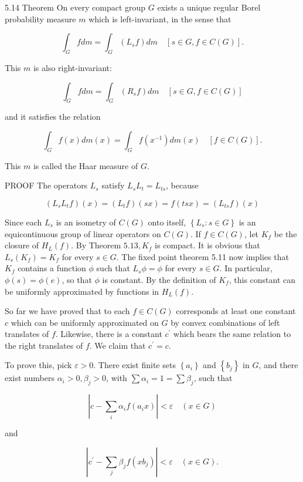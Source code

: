 \documentclass[10pt]{article}
\begin{document}
5.14 Theorem On every compact group $G$ exists a unique regular Borel probability measure $m$ which is left-invariant, in the sense that

$$
\int_{G} f d m=\int_{G}\left(L_{s} f\right) d m \quad[s \in G, f \in C(G)] .
$$

This $m$ is also right-invariant:

$$
\int_{G} f d m=\int_{G}\left(R_{s} f\right) d m \quad[s \in G, f \in C(G)]
$$

and it satisfies the relation

$$
\int_{G} f(x) d m(x)=\int_{G} f\left(x^{-1}\right) d m(x) \quad[f \in C(G)] .
$$

This $m$ is called the Haar measure of $G$.

PROOF The operators $L_{s}$ satisfy $L_{s} L_{t}=L_{t s}$, because

$$
\left(L_{s} L_{t} f\right)(x)=\left(L_{t} f\right)(s x)=f(t s x)=\left(L_{t s} f\right)(x)
$$

Since each $L_{s}$ is an isometry of $C(G)$ onto itself, $\left\{L_{s}: s \in G\right\}$ is an equicontinuous group of linear operators on $C(G)$. If $f \in C(G)$, let $K_{f}$ be the closure of $H_{L}(f)$. By Theorem $5.13, K_{f}$ is compact. It is obvious that $L_{s}\left(K_{f}\right)=K_{f}$ for every $s \in G$. The fixed point theorem 5.11 now implies that $K_{f}$ contains a function $\phi$ such that $L_{s} \phi=\phi$ for every $s \in G$. In particular, $\phi(s)=\phi(e)$, so that $\phi$ is constant. By the definition of $K_{f}$, this constant can be uniformly approximated by functions in $H_{L}(f)$.

So far we have proved that to each $f \in C(G)$ corresponds at least one constant $c$ which can be uniformly approximated on $G$ by convex combinations of left translates of $f$. Likewise, there is a constant $c^{\prime}$ which bears the same relation to the right translates of $f$. We claim that $c^{\prime}=c$.

To prove this, pick $\varepsilon>0$. There exist finite sets $\left\{a_{i}\right\}$ and $\left\{b_{j}\right\}$ in $G$, and there exist numbers $\alpha_{i}>0, \beta_{j}>0$, with $\sum \alpha_{i}=1=\sum \beta_{j}$, such that

$$
\left|c-\sum_{i} \alpha_{i} f\left(a_{i} x\right)\right|<\varepsilon \quad(x \in G)
$$

and

$$
\left|c^{\prime}-\sum_{j} \beta_{j} f\left(x b_{j}\right)\right|<\varepsilon \quad(x \in G) .
$$
\end{document}
